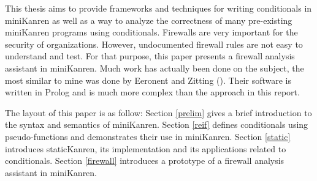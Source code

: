 \ifthesis This thesis aims to provide frameworks and techniques for writing conditionals in miniKanren as well as a way to analyze the correctness of many pre-existing miniKanren programs using conditionals.
\else Firewalls are very important for the security of organizations. However, undocumented firewall rules are not easy to understand and test. For that purpose, this paper presents a firewall analysis assistant in miniKanren. Much work has actually been done on the subject, the most similar to mine was done by Eeronent and Zitting (\cite{Eronen2001AnES}). Their software is written in Prolog and is much more complex than the approach in this report.\fi

The layout of this paper is as follow: Section \ref{prelim} gives a brief introduction to the syntax and semantics of miniKanren.
\ifthesis Section \ref{reif} defines conditionals using pseudo-functions and demonstrates their use in miniKanren. Section \ref{static} introduces staticKanren, its implementation and its applications related to conditionals.
\else Section \ref{firewall} introduces a prototype of a firewall analysis assistant in miniKanren.\fi